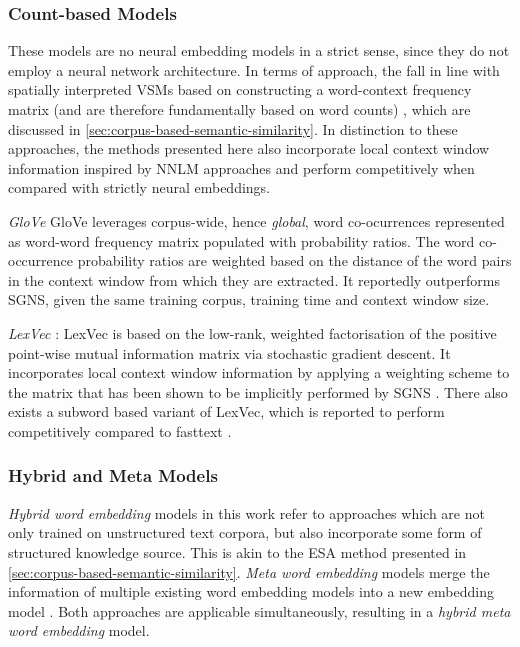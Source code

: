 \documentclass[11pt]{scrreprt}
\let\cite\parencite  %
\begin{document}
\subsubsection{Count-based Models}
These models are no neural embedding models in a strict sense, since they do not employ a neural network architecture. In terms of approach, the fall in line with spatially interpreted VSMs based on constructing a word-context frequency matrix (and are therefore fundamentally based on word counts) \cite{almeidaWordEmbeddingsSurvey2023, turneyFrequencyMeaningVector2010}, which are discussed in \cref{sec:corpus-based-semantic-similarity}. In distinction to these approaches, the methods presented here also incorporate local context window information inspired by NNLM approaches and perform competitively when compared with strictly neural embeddings.

\textit{GloVe} \cite{penningtonGloVeGlobalVectors2014} GloVe leverages corpus-wide, hence \textit{global}, word co-ocurrences represented as word-word frequency matrix populated with probability ratios. The word co-occurrence probability ratios are weighted based on the distance of the word pairs in the context window from which they are extracted. It reportedly outperforms SGNS, given the same training corpus, training time and context window size.

\textit{LexVec} \cite{salleMatrixFactorizationUsing2016, salleEnhancingLexVecDistributed2016, salleWhyRoleNegative2019}: LexVec is based on the low-rank, weighted factorisation of the positive point-wise mutual information matrix via stochastic gradient descent. It incorporates local context window information by applying a weighting scheme to the matrix that has been shown to be implicitly performed by SGNS \cite{levyNeuralWordEmbedding2014}. There also exists a subword based variant of LexVec, which is reported to perform competitively compared to fasttext \cite{salleIncorporatingSubwordInformation2018}.


\subsubsection{Hybrid and Meta Models}
\textit{Hybrid word embedding} models in this work refer to approaches which are not only trained on unstructured text corpora, but also incorporate some form of structured knowledge source. This is akin to the ESA method presented in \cref{sec:corpus-based-semantic-similarity}. \textit{Meta word embedding} models merge the information of multiple existing word embedding models into a new embedding model \cite{bollegalaSurveyWordMetaEmbedding2022}. Both approaches are applicable simultaneously, resulting in a \textit{hybrid meta word embedding} model.
\end{document}
